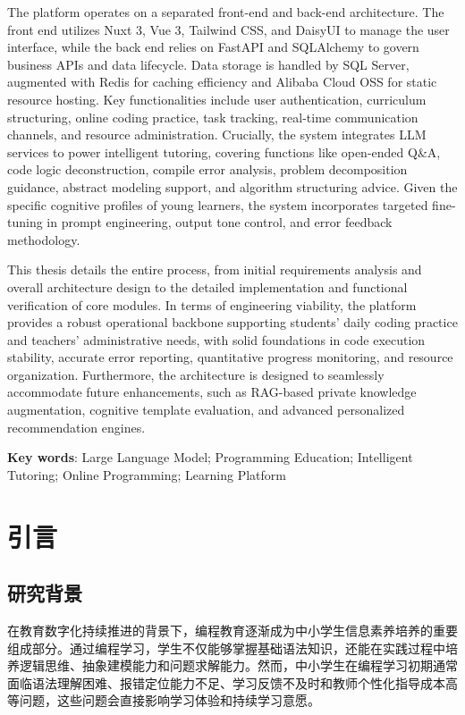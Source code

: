 The platform operates on a separated front-end and back-end architecture. The front end utilizes Nuxt 3, Vue 3, Tailwind CSS, and DaisyUI to manage the user interface, while the back end relies on FastAPI and SQLAlchemy to govern business APIs and data lifecycle. Data storage is handled by SQL Server, augmented with Redis for caching efficiency and Alibaba Cloud OSS for static resource hosting. Key functionalities include user authentication, curriculum structuring, online coding practice, task tracking, real-time communication channels, and resource administration. Crucially, the system integrates LLM services to power intelligent tutoring, covering functions like open-ended Q\&A, code logic deconstruction, compile error analysis, problem decomposition guidance, abstract modeling support, and algorithm structuring advice. Given the specific cognitive profiles of young learners, the system incorporates targeted fine-tuning in prompt engineering, output tone control, and error feedback methodology.

This thesis details the entire process, from initial requirements analysis and overall architecture design to the detailed implementation and functional verification of core modules. In terms of engineering viability, the platform provides a robust operational backbone supporting students' daily coding practice and teachers' administrative needs, with solid foundations in code execution stability, accurate error reporting, quantitative progress monitoring, and resource organization. Furthermore, the architecture is designed to seamlessly accommodate future enhancements, such as RAG-based private knowledge augmentation, cognitive template evaluation, and advanced personalized recommendation engines.

\textbf{Key words}: Large Language Model; Programming Education; Intelligent Tutoring; Online Programming; Learning Platform

\chapter{引言}\label{ux5f15ux8a00}

\section{研究背景}\label{ux7814ux7a76ux80ccux666f}

在教育数字化持续推进的背景下，编程教育逐渐成为中小学生信息素养培养的重要组成部分。通过编程学习，学生不仅能够掌握基础语法知识，还能在实践过程中培养逻辑思维、抽象建模能力和问题求解能力。然而，中小学生在编程学习初期通常面临语法理解困难、报错定位能力不足、学习反馈不及时和教师个性化指导成本高等问题，这些问题会直接影响学习体验和持续学习意愿。

